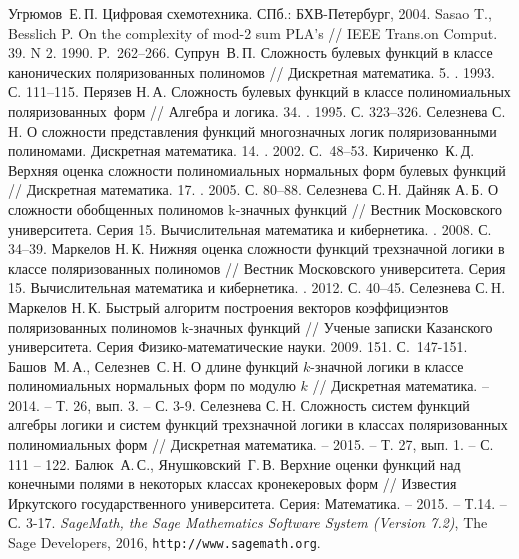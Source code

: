 \documentclass[bibliography=totoc, a4paper, 14pt]{extarticle}
\begin{document}
\begin{singlespace}
\begin{thebibliography}{0}
 Угрюмов~Е.\,П. Цифровая схемотехника. СПб.: БХВ-Петербург, 2004.
 Sasao T., Besslich P. On the complexity of mod-2 sum PLA’s  // IEEE Trans.on Comput. 39. N 2. 1990. P.~262--266.
 Супрун~В.\,П. Сложность булевых функций в классе канонических поляризованных полиномов // Дискретная математика. 5.
    . 1993. С. 111--115.
 Перязев Н.\,А. Сложность булевых функций в классе полиномиальных поляризованных~форм // Алгебра и логика. 34.
    . 1995. С. 323--326.
 Селезнева С.\,H. О сложности представления функций многозначных логик поляризованными полиномами. Дискретная
    математика. 14. . 2002. С.~48--53.
 Кириченко~К.\,Д. Верхняя оценка сложности полиномиальных нормальных форм булевых функций
    // Дискретная математика. 17. . 2005. С. 80--88.
 Селезнева С.\,Н. Дайняк А.\,Б. О сложности обобщенных полиномов k\nobreakdash-значных функций // Вестник Московского
    университета. Серия 15. Вычислительная математика и кибернетика. . 2008. С. 34--39.
 Маркелов Н.\,К. Нижняя оценка сложности функций трехзначной логики в классе поляризованных полиномов // Вестник
    Московского университета. Серия 15. Вычислительная математика и кибернетика. . 2012. С. 40--45.
 Селезнева С.\,H. Маркелов Н.\,К. Быстрый алгоритм построения векторов коэффициэнтов поляризованных полиномов
    k-значных функций // Ученые записки Казанского университета. Серия Физико-математические науки. 2009. 151.
     С.~147-151.
 Башов~М.\,А., Селезнев~С.\,Н. О длине функций $k$-значной логики в классе полиномиальных нормальных
    форм по модулю $k$ // Дискретная математика. -- 2014. -- Т. 26, вып. 3. -- С. 3-9.
 Селезнева С.\,H. Сложность систем функций алгебры логики и систем функций трехзначной логики в классах
    поляризованных полиномиальных форм // Дискретная математика. -- 2015. -- Т. 27, вып. 1. -- С. 111 -- 122. 
 Балюк~А.\,С., Янушковский~Г.\,В. Верхние оценки функций над конечными полями в некоторых классах
    кронекеровых форм // Известия Иркутского государственного университета. Серия: Математика. -- 2015. -- Т.14. -- С. 3-17.
\emph{{S}ageMath, the {S}age {M}athematics {S}oftware {S}ystem ({V}ersion
  7.2)}, The Sage Developers, 2016, {\tt http://www.sagemath.org}.
\end{thebibliography}

\end{singlespace}
\end{document}
